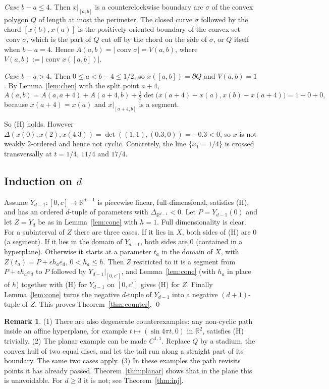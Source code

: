 \documentclass[11pt]{amsart}
\theoremstyle{definition}
\newtheorem{remark}[theorem]{Remark}
\newcommand{\R}{\mathbb{R}}
\newcommand{\conv}{\operatorname{conv}}
\begin{document}
\emph{Case $b-a\le4$.} Then $x|_{[a,b]}$ is a counterclockwise boundary arc $\sigma$ of the convex polygon $Q$ of length at most
the perimeter. The closed curve $\sigma$ followed by the chord $[x(b),x(a)]$ is the positively oriented boundary of the convex set
$\conv\sigma$, which is the part of $Q$ cut off by the chord on the side of $\sigma$, or $Q$ itself when $b-a=4$.
Hence $A(a,b)=|\conv\sigma|=V(a,b)$, where $V(a,b):=|\conv x([a,b])|$.

\emph{Case $b-a>4$.} Then $0\le a<b-4\le1/2$, so $x([a,b])=\partial Q$ and $V(a,b)=1$. By Lemma~\ref{lem:chen} with the split point $a+4$,
\[
A(a,b)=A(a,a+4)+A(a+4,b)+\tfrac12\det\big(x(a+4)-x(a),x(b)-x(a+4)\big)=1+0+0,
\]
because $x(a+4)=x(a)$ and $x|_{[a+4,b]}$ is a segment.

So (H) holds. However $\Delta(x(0),x(2),x(4.3))=\det((1,1),(0.3,0))=-0.3<0$, so $x$ is not weakly $2$-ordered and hence not cyclic.
Concretely, the line $\{x_1=1/4\}$ is crossed transversally at $t=1/4$, $11/4$ and $17/4$.

\subsection*{Induction on $d$}
Assume $Y_{d-1}:[0,c]\to\R^{d-1}$ is piecewise linear, full-dimensional, satisfies (H), and has an ordered $d$-tuple of parameters
with $\Delta_{\R^{d-1}}<0$. Let $P=Y_{d-1}(0)$ and let $Z=Y_d$ be as in Lemma~\ref{lem:cone} with $h=1$.
Full dimensionality is clear. For a subinterval of $Z$ there are three cases.
If it lies in $X$, both sides of (H) are $0$ (a segment).
If it lies in the domain of $Y_{d-1}$, both sides are $0$ (contained in a hyperplane).
Otherwise it starts at a parameter $t_a$ in the domain of $X$, with $Z(t_a)=P+\epsilon h_ae_d$, $0<h_a\le h$. Then $Z$ restricted to it is a segment from
$P+\epsilon h_ae_d$ to $P$ followed by $Y_{d-1}|_{[0,c']}$, and Lemma~\ref{lem:cone} (with $h_a$ in place of $h$)
together with (H) for $Y_{d-1}$ on $[0,c']$ gives (H) for $Z$.
Finally Lemma~\ref{lem:cone} turns the negative $d$-tuple of $Y_{d-1}$ into a negative $(d+1)$-tuple of $Z$.
This proves Theorem~\ref{thm:counter}. \qed

\begin{remark}
(1) There are also degenerate counterexamples: any non-cyclic path inside an affine hyperplane, for example
$t\mapsto(\sin4\pi t,0)$ in $\R^2$, satisfies (H) trivially.
(2) The planar example can be made $C^{1,1}$. Replace $Q$ by a stadium, the convex hull of two equal discs, and let the tail run along a
straight part of its boundary. The same two cases apply.
(3) In these examples the path revisits points it has already passed. Theorem~\ref{thm:planar} shows that in the plane this is unavoidable. For $d\ge3$ it is not; see Theorem~\ref{thm:inj}.
\end{remark}
\end{document}
